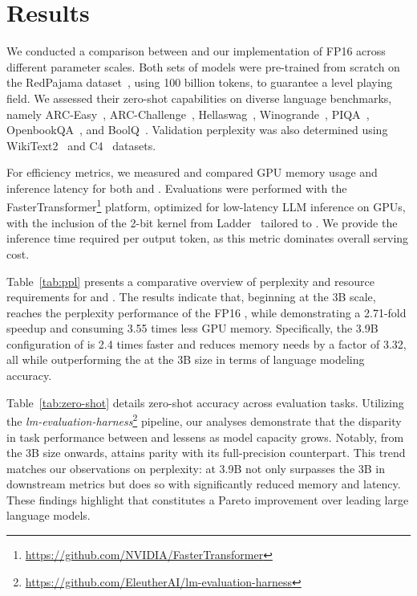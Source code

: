\section{Results}

We conducted a comparison between  and our implementation of FP16  across different parameter scales. Both sets of models were pre-trained from scratch on the RedPajama dataset~\cite{redpajama}, using 100 billion tokens, to guarantee a level playing field. We assessed their zero-shot capabilities on diverse language benchmarks, namely ARC-Easy~\cite{arc}, ARC-Challenge~\cite{arc}, Hellaswag~\cite{hellaswag}, Winogrande~\cite{winoGrande}, PIQA~\cite{piqa}, OpenbookQA~\cite{openbookqa}, and BoolQ~\cite{boolq}. Validation perplexity was also determined using WikiText2~\cite{wikitext2} and C4~\cite{c4} datasets.

For efficiency metrics, we measured and compared GPU memory usage and inference latency for both  and . Evaluations were performed with the FasterTransformer\footnote{\url{https://github.com/NVIDIA/FasterTransformer}} platform, optimized for low-latency LLM inference on GPUs, with the inclusion of the 2-bit kernel from Ladder~\cite{ladder} tailored to . We provide the inference time required per output token, as this metric dominates overall serving cost.

Table~\ref{tab:ppl} presents a comparative overview of perplexity and resource requirements for  and . The results indicate that, beginning at the 3B scale,  reaches the perplexity performance of the FP16 , while demonstrating a 2.71-fold speedup and consuming 3.55 times less GPU memory. Specifically, the 3.9B configuration of  is 2.4 times faster and reduces memory needs by a factor of 3.32, all while outperforming the  at the 3B size in terms of language modeling accuracy.

Table~\ref{tab:zero-shot} details zero-shot accuracy across evaluation tasks. Utilizing the \emph{lm-evaluation-harness}\footnote{\url{https://github.com/EleutherAI/lm-evaluation-harness}} pipeline, our analyses demonstrate that the disparity in task performance between  and  lessens as model capacity grows. Notably, from the 3B size onwards,  attains parity with its full-precision counterpart. This trend matches our observations on perplexity:  at 3.9B not only surpasses the 3B  in downstream metrics but does so with significantly reduced memory and latency. These findings highlight that  constitutes a Pareto improvement over leading large language models.

